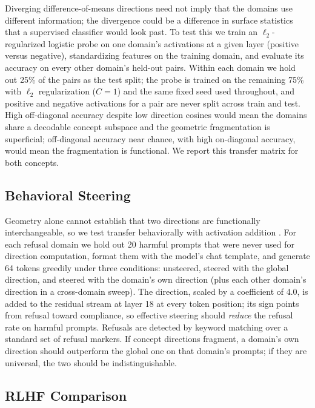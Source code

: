 \documentclass[11pt]{article}
\begin{document}
Diverging difference-of-means directions need not imply that the domains use
different information; the divergence could be a difference in surface
statistics that a supervised classifier would look past. To test this we
train an $\ell_2$-regularized logistic probe on one domain's activations at a
given layer (positive versus negative), standardizing features on the
training domain, and evaluate its accuracy on every other domain's held-out
pairs. Within each domain we hold out 25\% of the pairs as the test split;
the probe is trained on the remaining 75\% with $\ell_2$ regularization
($C{=}1$) and the same fixed seed used throughout, and positive and negative
activations for a pair are never split across train and test. High
off-diagonal accuracy despite low direction cosines would mean the domains
share a decodable concept subspace and the geometric fragmentation is
superficial; off-diagonal accuracy near chance, with high on-diagonal
accuracy, would mean the fragmentation is functional. We report this
transfer matrix for both concepts.

\subsection{Behavioral Steering}
\label{sec:steering-method}

Geometry alone cannot establish that two directions are functionally
interchangeable, so we test transfer behaviorally with activation addition
\citep{turner2023activation,li2024inference}. For each refusal domain we
hold out 20 harmful prompts that were never used for direction computation,
format them with the model's chat template, and generate 64 tokens greedily
under three conditions: unsteered, steered with the global direction, and
steered with the domain's own direction (plus each other domain's direction
in a cross-domain sweep). The direction, scaled by a coefficient of 4.0, is
added to the residual stream at layer 18 at every token position; its sign
points from refusal toward compliance, so effective steering should
\emph{reduce} the refusal rate on harmful prompts. Refusals are detected by
keyword matching over a standard set of refusal markers. If concept
directions fragment, a domain's own direction should outperform the global
one on that domain's prompts; if they are universal, the two should be
indistinguishable.

\subsection{RLHF Comparison}
\label{sec:rlhf-method}
\end{document}
